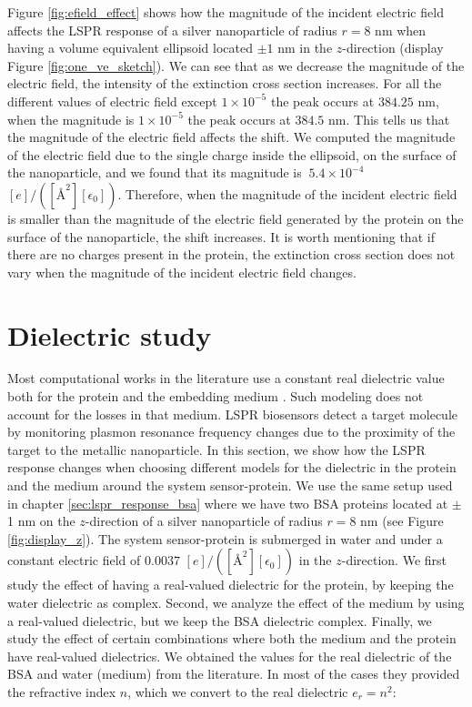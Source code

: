 Figure \ref{fig:efield_effect} shows how the magnitude of the incident electric field affects the LSPR response 
of a silver nanoparticle of radius $r=8$ nm when having a volume equivalent ellipsoid located 
$\pm 1$ nm in the $z$-direction (display Figure \ref{fig:one_ve_sketch}). We can see that as we decrease the magnitude of the electric field, 
the intensity of the extinction cross section increases. For all the different values of electric field except 
$1\times10^{-5}$ the peak occurs at $384.25$ nm, when the magnitude is $1\times10^{-5}$ the peak occurs at 
$384.5$ nm. This tells us that the magnitude of the electric field affects the shift. We computed 
the magnitude of the electric field due to the single charge inside the ellipsoid, on the surface of the nanoparticle,
and we found that its magnitude is $~5.4 \times 10^{-4}$ $[e]/([{\text{\AA}}^2][\epsilon_0])$. Therefore, 
when the magnitude of the incident electric field is smaller than the magnitude of the electric field generated by 
the protein on the surface of the nanoparticle, the shift increases. It is worth mentioning that if there are no charges 
present in the protein, the extinction cross section does not vary when the magnitude of the incident electric field 
changes. 


\section{Dielectric study}\label{sec:diel_study}

Most computational works in the literature use a constant real dielectric value both for the protein and the
embedding medium \cite{NghiemETal2012, SantiagoCordobaETal2011,UngerETal2009}. Such modeling does not account for the losses 
in that medium. LSPR biosensors detect a target molecule by monitoring plasmon resonance frequency changes due to the proximity 
of the target to the metallic nanoparticle. In this section, we show how the LSPR response changes when choosing different models 
for the dielectric in the protein and the medium around the system sensor-protein. We use the same setup used in chapter \ref{sec:lspr_response_bsa}
where we have two BSA proteins located at $\pm$ 1 nm on the $z$-direction of a silver nanoparticle of radius $r=8$ nm (see 
Figure \ref{fig:display_z}). The system sensor-protein is submerged in water and under a constant electric field of 
$0.0037$ $[e]/([{\text{\AA}}^2][\epsilon_0])$ in the $z$-direction. We first study the effect of having a real-valued dielectric 
for the protein, by keeping the water dielectric as complex. Second, we analyze the effect of the medium by using a real-valued 
dielectric, but we keep the BSA dielectric complex. Finally, we study the effect of certain combinations where both the medium 
and the protein have real-valued dielectrics. We obtained the values for the real dielectric of the BSA and water (medium) from the literature.
In most of the cases they provided the refractive index $n$, which we convert to the real dielectric $e_r=n^2$:  

